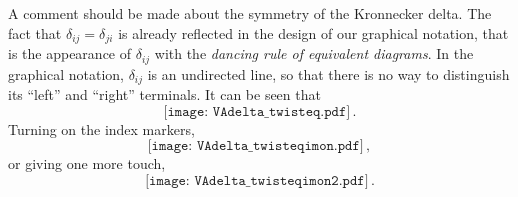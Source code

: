 \begin{description}
A comment should be made about the symmetry of the Kronnecker delta. The
fact that $\delta_{ij}=\delta_{ji}$ is {already reflected in the
design} of our graphical notation, that is the appearance of
$\delta_{ij}$ with the \textit{dancing rule of equivalent diagrams}. In
the graphical notation, $\delta_{ij}$ is an undirected line, so that
there is no way to distinguish its ``left'' and ``right'' terminals.
It can be seen that
\begin{equation}
    \texttt{[image: VAdelta\_twisteq.pdf]}\,.
    \label{eq:deltatwist}
\end{equation}
Turning on the index markers,
\begin{equation}
    \texttt{[image: VAdelta\_twisteqimon.pdf]}\,,
\end{equation}
or giving one more touch,
\begin{equation}
    \texttt{[image: VAdelta\_twisteqimon2.pdf]}\,.
    \label{eq:deltatwistimon}
\end{equation}


\end{description}
